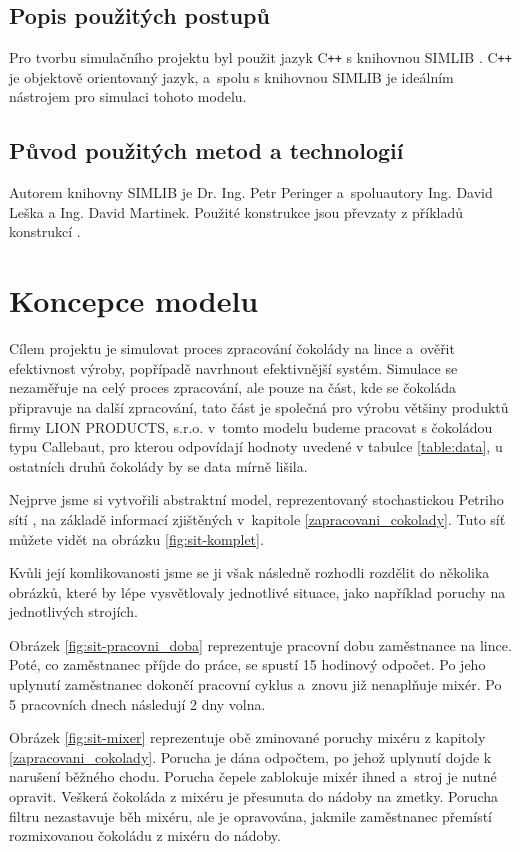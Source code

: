 \documentclass[11pt,a4paper,titlepage]{article}
\begin{document}
		\subsection{Popis použitých postupů}
			Pro tvorbu simulačního projektu byl použit jazyk C\texttt{++} s knihovnou
			SIMLIB \cite{web:Simlib}. C\texttt{++} je objektově orientovaný jazyk, a~spolu s knihovnou
			SIMLIB je ideálním nástrojem pro simulaci tohoto modelu.

		\subsection{Původ použitých metod a technologií}
			Autorem knihovny SIMLIB je Dr. Ing. Petr Peringer a~spoluautory Ing. David Leška a Ing. David Martinek. Použité konstrukce
			jsou převzaty z příkladů konstrukcí \cite{web:simlib_examples}.

	\section{Koncepce modelu}
		Cílem projektu je simulovat proces zpracování čokolády na lince a~ověřit
		efektivnost výroby, popřípadě navrhnout efektivnější systém. Simulace
		se nezaměřuje na celý proces zpracování, ale pouze na část, kde se čokoláda
		připravuje na další zpracování, tato část je společná pro výrobu většiny
		produktů firmy LION PRODUCTS, s.r.o. v~tomto modelu budeme pracovat s
		čokoládou typu Callebaut, pro kterou odpovídají hodnoty uvedené v
		tabulce \ref{table:data}, u ostatních druhů čokolády by se data mírně lišila.

		Nejprve jsme si vytvořili abstraktní model, reprezentovaný stochastickou Petriho sítí
		\cite[strany 123 -- 135]{web:prednasky},
		na základě informací zjištěných v~kapitole \ref{zapracovani_cokolady}.
		Tuto síť můžete vidět na obrázku \ref{fig:sit-komplet}.

		Kvůli její komlikovanosti jsme se ji však následně rozhodli rozdělit do několika obrázků,
		které by lépe vysvětlovaly jednotlivé situace, jako například poruchy na jednotlivých strojích.

		Obrázek \ref{fig:sit-pracovni_doba} reprezentuje pracovní dobu zaměstnance na lince.
		Poté, co zaměstnanec příjde do práce, se spustí 15 hodinový odpočet.
		Po jeho uplynutí zaměstnanec dokončí pracovní cyklus a~znovu již nenaplňuje mixér.
		Po 5 pracovních dnech následují 2 dny volna.

		Obrázek \ref{fig:sit-mixer} reprezentuje obě zminované poruchy mixéru z kapitoly \ref{zapracovani_cokolady}.
		Porucha je dána odpočtem, po jehož uplynutí dojde k narušení běžného chodu.
		Porucha čepele zablokuje mixér ihned a~stroj je nutné opravit. Veškerá čokoláda z mixéru je přesunuta do nádoby na zmetky.
		Porucha filtru nezastavuje běh mixéru, ale je opravována, jakmile zaměstnanec přemístí rozmixovanou čokoládu z mixéru do nádoby.
\end{document}

